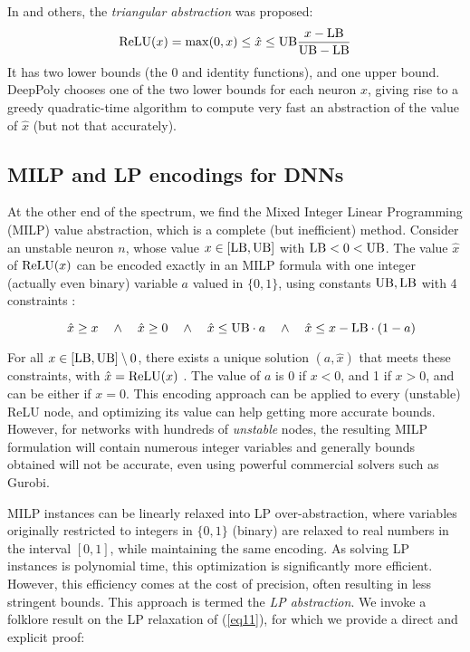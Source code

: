 In \cite{DBLP_Ehlers17,deeppoly} and others, the {\em triangular abstraction} was proposed:
\begin{align}
	\mathrm{ReLU}(x) = \max (0,x) \leq \hat{x} \leq \mathrm{UB} \frac{x-\mathrm{LB}}{\mathrm{UB}-\mathrm{LB}} 
	\label{eq:deeppoly}
\end{align} 
It has two lower bounds (the 0 and identity functions), and one upper bound. 
DeepPoly \cite{deeppoly} chooses one of the two lower bounds for each neuron $x$, giving rise to a greedy quadratic-time algorithm to compute very fast an abstraction of the value of $\hat{x}$ (but not that accurately).




\subsection{MILP and LP encodings for DNNs}

At the other end of the spectrum, we find the Mixed Integer Linear Programming (MILP) value abstraction, which is a complete (but inefficient) method. 
Consider an unstable neuron $n$, whose value $x \in [\mathrm{LB},\mathrm{UB}]$ with $\mathrm{LB}<0<\mathrm{UB}$.
The value $\hat{x}$ of $\mathrm{ReLU}(x)$ can be encoded exactly in an MILP formula with one 
integer (actually even binary) variable $a$ valued in $\{0,1\}$, using constants $\mathrm{UB},\mathrm{LB}$ with 4 constraints \cite{MILP}:

\vspace{-0.4cm}
\begin{equation}\quad \hat{x} \geq x \quad \wedge \quad \hat{x} \geq 0 \quad \wedge \quad \hat{x} \leq \mathrm{UB} \cdot a \quad \wedge \quad \hat{x} \leq x-\mathrm{LB} \cdot (1-a)
\label{eq11}
\end{equation}

For all $x \in [\mathrm{LB},\mathrm{UB}] \setminus 0$, there exists a unique solution $(a,\hat{x})$ that meets these constraints, with $\hat{x}=\mathrm{ReLU}(x)$ \cite{MILP}. The value of $a$ is 0 if $x < 0$, and 1 if $x>0$, and can be either if $x=0$. This encoding approach can be applied to every (unstable) ReLU node, and optimizing its value can help getting more accurate bounds. However, for networks with hundreds of {\em unstable} nodes, the resulting MILP formulation will contain numerous integer variables and generally bounds obtained will not be accurate, even using powerful commercial solvers such as Gurobi.

MILP instances can be linearly relaxed into LP over-abstraction, where variables originally restricted to integers in $\{0,1\}$ (binary) are relaxed to real numbers in the interval $[0,1]$, while maintaining the same encoding. As solving LP instances is polynomial time, this optimization is significantly more efficient. However, this efficiency comes at the cost of precision, often resulting in less stringent bounds. This approach is termed the {\em LP abstraction}. We invoke a folklore result on the LP relaxation of (\ref{eq11}), for which we provide a direct and explicit proof:

